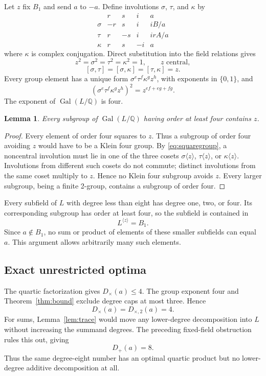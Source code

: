 \documentclass[11pt,a4paper]{article}
\newtheorem{lemma}[theorem]{Lemma}
\theoremstyle{definition}\newtheorem{definition}[theorem]{Definition}
\theoremstyle{remark}\newtheorem{remark}[theorem]{Remark}
\newcommand{\Q}{\mathbb Q}
\newcommand{\Gal}{\operatorname{Gal}}
\newcommand{\Dplus}{D_{+}}
\newcommand{\Dtimes}{D_{\times}}
\newcommand{\Dtwo}{D_{\times,2}}
\begin{document}
Let $z$ fix $B_1$ and send $a$ to $-a$. Define involutions $\sigma$,
$\tau$, and $\kappa$ by
\[
\begin{array}{c|rrrr}
 &r&s&i&a\\\hline
\sigma&-r&s&i&iB/a\\
\tau&r&-s&i&irA/a\\
\kappa&r&s&-i&a
\end{array}
\]
where $\kappa$ is complex conjugation. Direct substitution into the field
relations gives
\[
 z^2=\sigma^2=\tau^2=\kappa^2=1,\qquad z\text{ central},
\]
\[
 [\sigma,\tau]=[\sigma,\kappa]=[\tau,\kappa]=z.
\]
Every group element has a unique form
$\sigma^e\tau^f\kappa^g z^h$, with exponents in $\{0,1\}$, and
\begin{equation}
 (\sigma^e\tau^f\kappa^g z^h)^2=z^{ef+eg+fg}.
 \label{eq:squaregroup}
\end{equation}
The exponent of $\Gal(L/\Q)$ is four.

\begin{lemma}
Every subgroup of $\Gal(L/\Q)$ having order at least four contains $z$.
\end{lemma}
\begin{proof}
Every element of order four squares to $z$. Thus a subgroup of order four
avoiding $z$ would have to be a Klein four group. By
\eqref{eq:squaregroup}, a noncentral involution must lie in one of the
three cosets $\sigma\langle z\rangle$,
$\tau\langle z\rangle$, or $\kappa\langle z\rangle$.
Involutions from different such cosets do not commute; distinct involutions
from the same coset multiply to $z$. Hence no Klein four subgroup avoids
$z$. Every larger subgroup, being a finite 2-group, contains a subgroup of
order four.
\end{proof}

Every subfield of $L$ with degree less than eight has degree one, two, or
four. Its corresponding subgroup has order at least four, so the subfield
is contained in
\[
 L^{\langle z\rangle}=B_1.
\]
Since $a\notin B_1$, no sum or product of elements of these smaller
subfields can equal $a$. This argument allows arbitrarily many such
elements.

\subsection{Exact unrestricted optima}

The quartic factorization gives $\Dtimes(a)\le4$. The group exponent four
and Theorem~\ref{thm:bound} exclude degree caps at most three. Hence
\[
 \boxed{\Dtimes(a)=\Dtwo(a)=4.}
\]
For sums, Lemma~\ref{lem:trace} would move any lower-degree decomposition
into $L$ without increasing the summand degrees. The preceding fixed-field
obstruction rules this out, giving
\[
 \boxed{\Dplus(a)=8.}
\]
Thus the same degree-eight number has an optimal quartic product but no
lower-degree additive decomposition at all.
\end{document}
